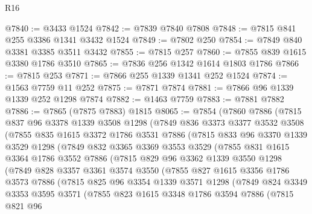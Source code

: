 \begin{lexlean}{R16}
\begin{coremodule}
@7840 := @3433 @1524
@7842 := @7839 @7840 @7808
@7848 := @7815 @841 @255 @3386 @1341 @3432 @1524
@7849 := @7802 @250
@7854 := @7849 @840 @3381 @3385 @3511 @3432
@7855 := @7815 @257
@7860 := @7855 @839 @1615 @3380 @1786 @3510
@7865 := @7836 @256 @1342 @1614 @1803 @1786
@7866 := @7815 @253
@7871 := @7866 @255 @1339 @1341 @252 @1524
@7874 := @1563 @7759 @11 @252
@7875 := @7871 @7874
@7881 := @7866 @96 @1339 @1339 @252 @1298 @7874
@7882 := @1463 @7759
@7883 := @7881 @7882
@7886 := @7865 (@7875 @7883) @1815
@8065 := @7854
    (@7860
      @7886
      (@7815
        @837
        @96
        @3378
        @1339
        @3508
        @1298
        (@7849
          @836
          @3373
          @3377
          @3532
          @3508
          (@7855
            @835
            @1615
            @3372
            @1786
            @3531
            @7886
            (@7815
              @833
              @96
              @3370
              @1339
              @3529
              @1298
              (@7849
                @832
                @3365
                @3369
                @3553
                @3529
                (@7855
                  @831
                  @1615
                  @3364
                  @1786
                  @3552
                  @7886
                  (@7815
                    @829
                    @96
                    @3362
                    @1339
                    @3550
                    @1298
                    (@7849
                      @828
                      @3357
                      @3361
                      @3574
                      @3550
                      (@7855
                        @827
                        @1615
                        @3356
                        @1786
                        @3573
                        @7886
                        (@7815
                          @825
                          @96
                          @3354
                          @1339
                          @3571
                          @1298
                          (@7849
                            @824
                            @3349
                            @3353
                            @3595
                            @3571
                            (@7855
                              @823
                              @1615
                              @3348
                              @1786
                              @3594
                              @7886
                              (@7815
                                @821
                                @96

\end{coremodule}
\end{lexlean}

